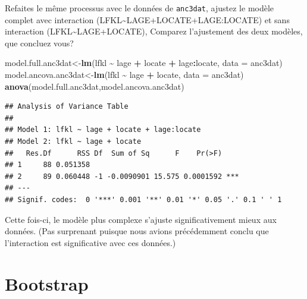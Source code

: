\documentclass[
  12pt,
]{book}
\makeatletter
\newenvironment{Shaded}{\begin{snugshade}}{\end{snugshade}}
\newcommand{\DataTypeTok}[1]{\textcolor[rgb]{0.13,0.29,0.53}{#1}}
\newcommand{\KeywordTok}[1]{\textcolor[rgb]{0.13,0.29,0.53}{\textbf{#1}}}
\newcommand{\NormalTok}[1]{#1}
\newcommand{\OperatorTok}[1]{\textcolor[rgb]{0.81,0.36,0.00}{\textbf{#1}}}
\newcommand{\StringTok}[1]{\textcolor[rgb]{0.31,0.60,0.02}{#1}}
\newenvironment{kframe}{%
\medskip{}
\setlength{\fboxsep}{.8em}
\def\at@end@of@kframe{}%
\ifinner\ifhmode%
 \def\at@end@of@kframe{\end{minipage}}%
 \begin{minipage}{\columnwidth}%
\fi\fi%
\def\FrameCommand##1{\hskip\@totalleftmargin \hskip-\fboxsep
\colorbox{incolor}{##1}\hskip-\fboxsep
    \hskip-\linewidth \hskip-\@totalleftmargin \hskip\columnwidth}%
\MakeFramed {\advance\hsize-\width
  \@totalleftmargin\z@ \linewidth\hsize
  \@setminipage}}%
{\par\unskip\endMakeFramed%
\at@end@of@kframe}
\newenvironment{rmdblock}[1]
 {
 \begin{itemize}
 \renewcommand{\labelitemi}{
   \raisebox{-.7\height}[0pt][0pt]{
     {\setkeys{Gin}{width=3em,keepaspectratio}\texttt{[image: images/\#1]}}
   }
 }
 \begin{kframe}
 \setlength{\fboxsep}{1em}
 \item
 }
 {
 \end{kframe}
 \end{itemize}
 }
\newenvironment{rmdcode}
  {\begin{rmdblock}{screen}}
  {\end{rmdblock}}
\makeatother
\begin{document}
\begin{rmdcode}
Refaites le même processus avec le données de \texttt{anc3dat}, ajustez le modèle complet avec interaction (LFKL\textasciitilde LAGE+LOCATE+LAGE:LOCATE) et sans interaction (LFKL\textasciitilde LAGE+LOCATE), Comparez l'ajustement des deux modèles, que concluez vous?
\end{rmdcode}

\begin{Shaded}
\begin{Highlighting}[]
\NormalTok{model.full.anc3dat\textless{}{-}}\KeywordTok{lm}\NormalTok{(lfkl }\OperatorTok{\textasciitilde{}}\StringTok{ }\NormalTok{lage }\OperatorTok{+}\StringTok{ }\NormalTok{locate }\OperatorTok{+}\StringTok{ }\NormalTok{lage}\OperatorTok{:}\NormalTok{locate, }\DataTypeTok{data =}\NormalTok{ anc3dat)}
\NormalTok{model.ancova.anc3dat\textless{}{-}}\KeywordTok{lm}\NormalTok{(lfkl }\OperatorTok{\textasciitilde{}}\StringTok{ }\NormalTok{lage }\OperatorTok{+}\StringTok{ }\NormalTok{locate, }\DataTypeTok{data =}\NormalTok{ anc3dat)}
\KeywordTok{anova}\NormalTok{(model.full.anc3dat,model.ancova.anc3dat)}
\end{Highlighting}
\end{Shaded}

\begin{verbatim}
## Analysis of Variance Table
## 
## Model 1: lfkl ~ lage + locate + lage:locate
## Model 2: lfkl ~ lage + locate
##   Res.Df      RSS Df  Sum of Sq      F    Pr(>F)    
## 1     88 0.051358                                   
## 2     89 0.060448 -1 -0.0090901 15.575 0.0001592 ***
## ---
## Signif. codes:  0 '***' 0.001 '**' 0.01 '*' 0.05 '.' 0.1 ' ' 1
\end{verbatim}

Cette fois-ci, le modèle plus complexe s'ajuste significativement mieux aux données. (Pas surprenant puisque nous avions précédemment conclu que l'interaction est significative avec ces données.)

\hypertarget{bootstrap-1}{%
\section{Bootstrap}\label{bootstrap-1}}
\end{document}
